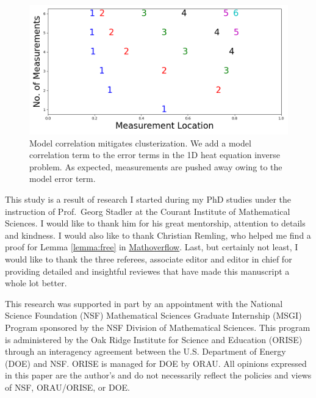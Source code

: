 \documentclass[ba]{imsart}
\theoremstyle{plain}
\theoremstyle{definition}
\theoremstyle{remark}
\begin{document}
\begin{figure}
    \centering
    \includegraphics[height=0.5\textwidth]{figs/dst_modelError4.png}
    \caption{Model correlation mitigates clusterization. We add a
      model correlation term to the error terms in the 1D heat
      equation inverse problem. As expected, measurements are pushed
      away owing to the model error term.}
  \label{fig:corr_errors}
\end{figure}




 


\begin{acks}[Acknowledgments]
  This study is a result of research I started during my PhD studies
  under the instruction of Prof.~Georg Stadler at the Courant
  Institute of Mathematical Sciences. I would like to thank him for
  his great mentorship, attention to details and kindness. I would
  also like to thank Christian Remling, who helped me find a proof for
  Lemma \ref{lemma:free} in
  \href{https://mathoverflow.net/questions/280168/redistribute-diagonal-entries-of-a-matrix/280203#280203c}{Mathoverflow}.
  Last, but certainly not least, I would like to thank the three
  referees, associate editor and editor in chief for providing
  detailed and insightful reviewes that have made this manuscript a
  whole lot better.


  
  This research was supported in part by an appointment with the
  National Science Foundation (NSF) Mathematical Sciences Graduate
  Internship (MSGI) Program sponsored by the NSF Division of
  Mathematical Sciences. This program is administered by the Oak Ridge
  Institute for Science and Education (ORISE) through an interagency
  agreement between the U.S. Department of Energy (DOE) and NSF. ORISE
  is managed for DOE by ORAU. All opinions expressed in this paper are
  the author's and do not necessarily reflect the policies and views
  of NSF, ORAU/ORISE, or DOE.
\end{acks}



\end{document}
